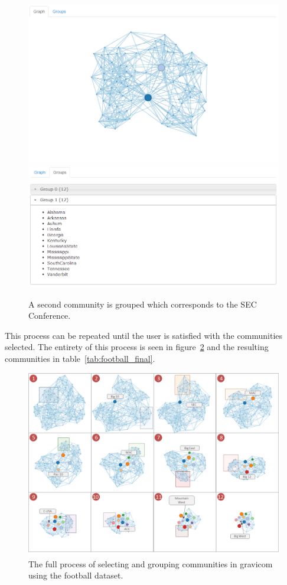 \documentclass{article}\usepackage[]{graphicx}\usepackage[]{color}
\begin{document}
\begin{figure}[H]
\centering
\includegraphics[width=\textwidth]{images/football_6.png}
\includegraphics[width=\textwidth]{images/football_7.png}
\caption{\label{fig:football_6} A second community is grouped which corresponds to the SEC Conference.}
\end{figure}

This process can be repeated until the user is satisfied with the communities selected. The entirety of this process is seen in figure~\ref{fig:football_progression} and the resulting communities in table~\ref{tab:football_final}. 

\begin{figure}[H]
\centering
\includegraphics[width=\textwidth]{images/football_progression.png}
\caption{\label{fig:football_progression}The full process of selecting and grouping communities in gravicom using the football dataset.}
\end{figure}
\end{document}
